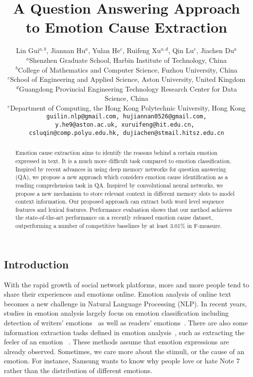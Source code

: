 \documentclass[11pt,letterpaper]{article}
\title{A Question Answering Approach to Emotion Cause Extraction}
\author{Lin Gui$^{a,b}$, Jiannan Hu$^a$, Yulan He$^c$, Ruifeng Xu$^{a,d}$\footnotemark[2], Qin Lu$^e$, Jiachen Du$^a$ \\
         $^a$Shenzhen Graduate School, Harbin Institute of Technology, China
  \\    $^b$College of Mathematics and Computer Science, Fuzhou University, China   \\    $^c$School of Engineering and Applied Science, Aston University, United Kingdom    \\   $^d$Guangdong Provincial Engineering Technology Research Center for Data Science, China   \\   $^e$Department of Computing, the Hong Kong Polytechnic University, Hong Kong \\
{\tt guilin.nlp@gmail.com, hujiannan0526@gmail.com,} \\ {\tt  y.he9@aston.ac.uk, xuruifeng@hit.edu.cn, }\\{\tt csluqin@comp.polyu.edu.hk, dujiachen@stmail.hitsz.edu.cn}}
\date{}
\begin{document}
\begin{CJK*}{UTF8}{gbsn} 

\maketitle

\begin{abstract}
Emotion cause extraction aims to identify the reasons behind a certain emotion expressed in text. It is a much more difficult task compared to emotion classification. Inspired by recent advances in using deep memory networks for question answering (QA), we propose a new approach which considers emotion cause identification as a reading comprehension task in QA. Inspired by convolutional neural networks, we propose a new mechanism to store relevant context in different memory slots to model context information. Our proposed approach can extract both word level sequence features and lexical features. Performance evaluation shows that our method achieves the state-of-the-art performance on a recently released emotion cause dataset, outperforming a number of competitive baselines by at least 3.01\% in F-measure.

\end{abstract}


\section{Introduction}
\label{sec:section1}

\renewcommand{\thefootnote}{\fnsymbol{footnote}}

With the rapid
growth of social network platforms, more and more people tend to share their experiences and emotions online. Emotion analysis of online text becomes a new challenge in Natural Language Processing (NLP). In recent years, studies in emotion analysis largely focus on emotion classification including detection of writers' emotions~\cite{gao2013joint} as well as readers' emotions~\cite{chang2015linguistic}. There are also some information extraction tasks defined in emotion analysis~\cite{Chen2016A,Balahur2011EmotiNet}, such as extracting the feeler of an emotion ~\cite{das2010finding}. These methods assume that emotion expressions are already observed. Sometimes,  we care more about the stimuli, or the cause of an emotion. For instance, Samsung wants to know why people love or hate Note 7 rather than the distribution of different emotions.


\end{CJK*}
\end{document}
